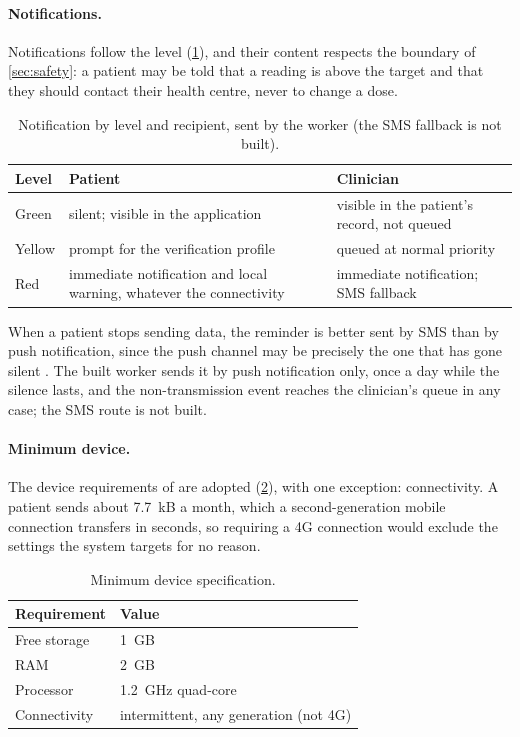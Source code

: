 \paragraph{Notifications.} Notifications follow the level (\cref{tab:notification}), and their content respects the boundary of \cref{sec:safety}: a patient may be told that a reading is above the target and that they should contact their health centre, never to change a dose.

\begin{table}[htbp]
\centering\small
\caption{Notification by level and recipient, sent by the worker (the SMS fallback is not built).}\label{tab:notification}
\begin{tabularx}{\textwidth}{@{}>{\raggedright\arraybackslash}p{1.6cm} X >{\raggedright\arraybackslash}p{4.2cm}@{}}
\toprule
\textbf{Level} & \textbf{Patient} & \textbf{Clinician} \\
\midrule
Green & silent; visible in the application & visible in the patient's record, not queued \\
Yellow & prompt for the verification profile & queued at normal priority \\
Red & immediate notification and local warning, whatever the connectivity & immediate notification; SMS fallback \\
\bottomrule
\end{tabularx}
\end{table}

When a patient stops sending data, the reminder is better sent by SMS than by push notification, since the push channel may be precisely the one that has gone silent \parencite{yazdani2018}. The built worker sends it by push notification only, once a day while the silence lasts, and the non-transmission event reaches the clinician's queue in any case; the SMS route is not built.

\paragraph{Minimum device.} The device requirements of \textcite{efendi2025} are adopted (\cref{tab:device-spec}), with one exception: connectivity. A patient sends about 7.7~kB a month, which a second-generation mobile connection transfers in seconds, so requiring a 4G connection would exclude the settings the system targets for no reason.

\begin{table}[htbp]
\centering\small
\caption{Minimum device specification.}\label{tab:device-spec}
\begin{tabularx}{\textwidth}{@{}>{\raggedright\arraybackslash}p{4.0cm} X@{}}
\toprule
\textbf{Requirement} & \textbf{Value} \\
\midrule
Free storage & 1~GB \\
RAM & 2~GB \\
Processor & 1.2~GHz quad-core \\
Connectivity & intermittent, any generation (not 4G) \\
\bottomrule
\end{tabularx}
\end{table}

